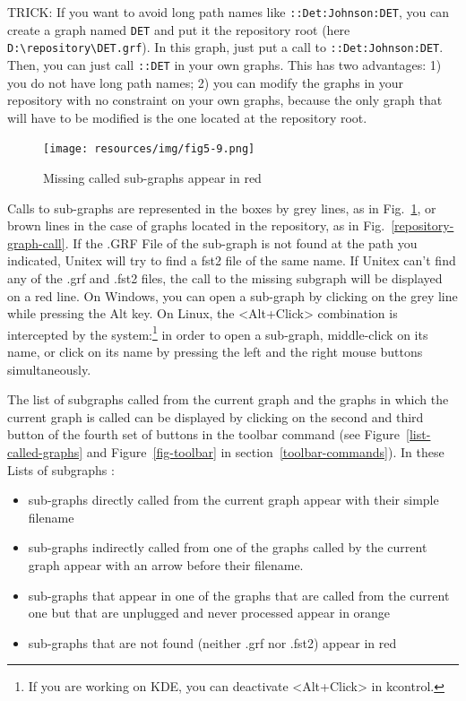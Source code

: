 
\noindent TRICK: If you want to avoid long path names like
\verb+::Det:Johnson:DET+, you can create a graph named \verb+DET+ and put it the
repository root (here \verb+D:\repository\DET.grf+). In this graph, just put a
call to \verb+::Det:Johnson:DET+. Then, you can just call \verb+::DET+ in your
own graphs. This has two advantages: 1) you do not have long path names; 2) you
can modify the graphs in your repository with no constraint on your own graphs,
because the only graph that will have to be modified is the one located at the
repository root.

\begin{figure}[!ht]
\begin{center}
\texttt{[image: resources/img/fig5-9.png]}
\caption{Missing called sub-graphs appear in red\label{call-colours}}
\end{center}
\end{figure}


\bigskip
\noindent Calls to sub-graphs are represented in the boxes by grey lines, as in Fig.~\ref{call-colours}, or brown
lines in the case of graphs located in the repository, as in Fig.~\ref{repository-graph-call}. If the .GRF File of the sub-graph is not found at the path you indicated, Unitex will try to find a fst2 file of the same name. If Unitex can't find any of the .grf and .fst2 files, the call to the missing subgraph will be displayed on a red line. 
On Windows, you can open a sub-graph by clicking on the grey line while pressing the Alt key.
On Linux, the <Alt+Click>  combination is intercepted by the system:\footnote{If you are 
working on KDE, you can deactivate <Alt+Click> in kcontrol.} in order to open a
sub-graph, middle-click on its name, or click on its name by pressing the left and the right mouse buttons
simultaneously.

\bigskip
\noindent The list of subgraphs called from the current graph and the graphs in which the current graph is called can be displayed by clicking on the second and third button of the fourth set of buttons in the toolbar command (see Figure~\ref{list-called-graphs} and
Figure~\ref{fig-toolbar} in section~\ref{toolbar-commands}).
In these Lists of subgraphs : 
\begin{itemize}
\item sub-graphs directly called from the current graph appear with their simple filename
\item sub-graphs indirectly called from one of the graphs called by the current graph appear with an arrow before their filename.
\item sub-graphs that appear in one of the graphs that are called from the current one but that are unplugged and never processed appear in orange
\item sub-graphs that are not found (neither .grf nor .fst2) appear in red
\end{itemize}

